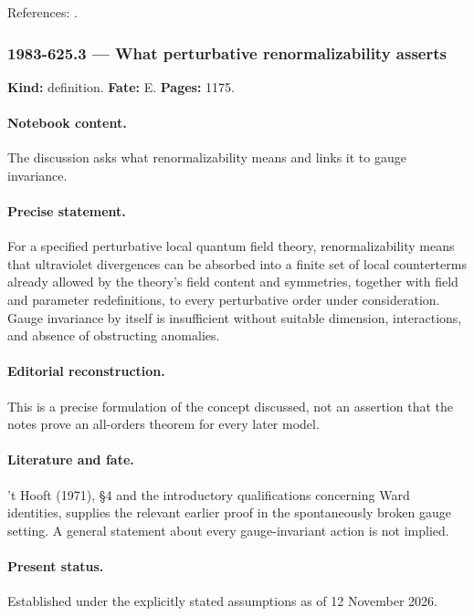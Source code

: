 \noindent References: \citep{thooft1971massive}.\par

\subsubsection{1983-625.3 --- What perturbative renormalizability asserts}

\label{item:1983-625.3}

\noindent\textbf{Kind:} definition. \textbf{Fate:} E. \textbf{Pages:} 1175.\par

\paragraph{Notebook content.} The discussion asks what renormalizability means and links it to gauge invariance.

\paragraph{Precise statement.} For a specified perturbative local quantum field theory, renormalizability means that ultraviolet divergences can be absorbed into a finite set of local counterterms already allowed by the theory’s field content and symmetries, together with field and parameter redefinitions, to every perturbative order under consideration. Gauge invariance by itself is insufficient without suitable dimension, interactions, and absence of obstructing anomalies.

\paragraph{Editorial reconstruction.} This is a precise formulation of the concept discussed, not an assertion that the notes prove an all-orders theorem for every later model.

\paragraph{Literature and fate.} ’t Hooft (1971), \S4 and the introductory qualifications concerning Ward identities, supplies the relevant earlier proof in the spontaneously broken gauge setting. A general statement about every gauge-invariant action is not implied.

\paragraph{Present status.} Established under the explicitly stated assumptions as of 12 November 2026.

